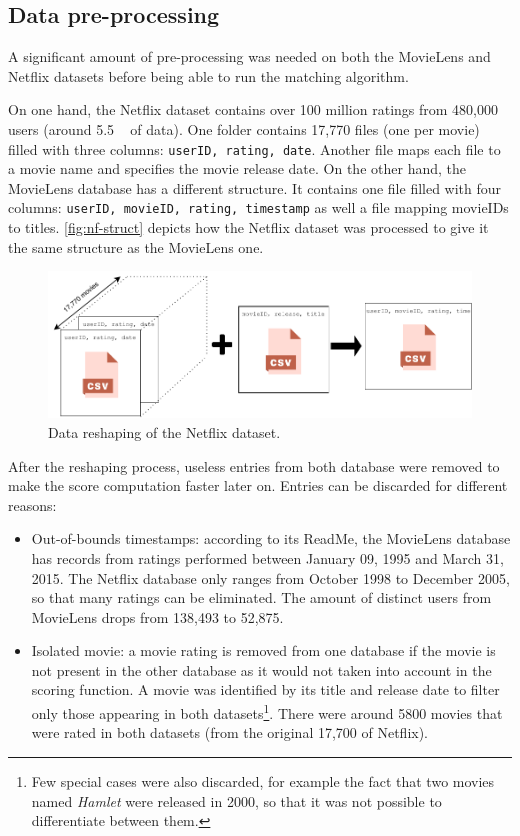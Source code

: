\subsection{Data pre-processing}

A significant amount of pre-processing was needed on both the MovieLens and Netflix datasets before being able to run the matching algorithm. 

On one hand, the Netflix dataset contains over 100 million ratings from 480,000 users (around 5.5 \si{\giga\byte} of data). One folder contains 17,770 files (one per movie) filled with three columns: \texttt{userID, rating, date}. Another file maps each file to a movie name and specifies the movie release date. On the other hand, the MovieLens database has a different structure. It contains one file filled with four columns: \texttt{userID, movieID, rating, timestamp} as well a file mapping movieIDs to titles. \autoref{fig:nf-struct} depicts how the Netflix dataset was processed to give it the same structure as the MovieLens one.

\begin{figure}[h]
	\centering
	\includegraphics[width=.9\linewidth]{img/processing.pdf}
	\caption{Data reshaping of the Netflix dataset.}
	\label{fig:nf-struct}
\end{figure}

After the reshaping process, useless entries from both database were removed to make the score computation faster later on. Entries can be discarded for different reasons:

\begin{itemize}
	\item Out-of-bounds timestamps: according to its ReadMe, the MovieLens database has records from ratings performed between January 09, 1995 and March 31, 2015. The Netflix database only ranges from October 1998 to December 2005, so that many ratings can be eliminated. The amount of distinct users from MovieLens drops from 138,493 to 52,875.
	
	\item Isolated movie: a movie rating is removed from one database if the movie is not present in the other database as it would not taken into account in the scoring function. A movie was identified by its title and release date to filter only those appearing in both datasets\footnote{Few special cases were also discarded, for example the fact that two movies named \textit{Hamlet} were released in 2000, so that it was not possible to differentiate between them.}. There were around 5800 movies that were rated in both datasets (from the original 17,700 of Netflix).
\end{itemize}

